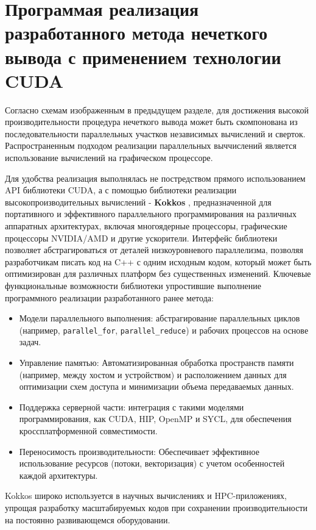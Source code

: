 \chapter{Программая реализация разработанного метода нечеткого вывода с применением технологии CUDA}\label{ch:ch3}

Согласно схемам \cite{} изображенным в предыдущем разделе, для достижения высокой производительности процедура нечеткого вывода может быть скомпонована из последовательности параллельных участков независимых вычислений и сверток. Распространенным подходом реализации параллельных выччислений является использование вычислений на графическом процессоре.

Для удобства реализация выполнялась не постредством прямого использованием API библиотеки CUDA, а с помощью библиотеки реализации высокопроизводительных вычислений - \textbf{Kokkos} \cite{KokkosWiki, KokkosCarterEdwards20143202}, предназначенной для портативного и эффективного параллельного программирования на различных аппаратных архитектурах, включая многоядерные процессоры, графические процессоры NVIDIA/AMD и другие ускорители. Интерфейс библиотеки позволяет абстрагироваться от деталей низкоуровневого параллелизма, позволяя разработчикам писать код на C++ с одним исходным кодом, который может быть оптимизирован для различных платформ без существенных изменений. 
Ключевые функциональные возможности библиотеки упростившие выполнение программного реализации разработанного ранее метода:
\begin{itemize}
\item Модели параллельного выполнения: абстрагирование параллельных циклов (например, \lstinline{parallel_for}, \lstinline{parallel_reduce}) и рабочих процессов на основе задач.  
\item Управление памятью: Автоматизированная обработка пространств памяти (например, между хостом и устройством) и расположением данных для оптимизации схем доступа и минимизации объема передаваемых данных.  
\item Поддержка серверной части: интеграция с такими моделями программирования, как CUDA, HIP, OpenMP и SYCL, для обеспечения кроссплатформенной совместимости.  
\item Переносимость производительности: Обеспечивает эффективное использование ресурсов (потоки, векторизация) с учетом особенностей каждой архитектуры.
\end{itemize}

Kokkos широко используется в научных вычислениях и HPC-приложениях, упрощая разработку масштабируемых кодов при сохранении производительности на постоянно развивающемся оборудовании. 

